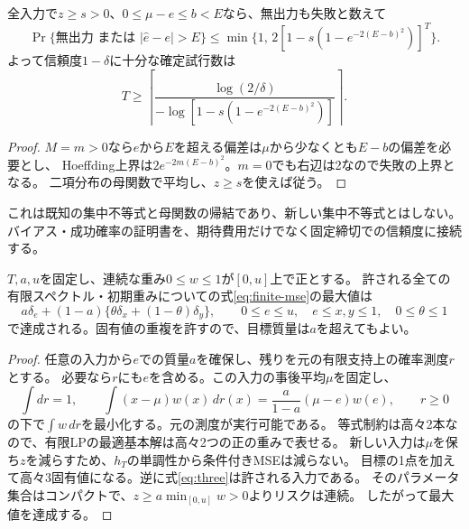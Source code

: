 \begin{corollary}[固定締切での一様信頼度]\label{cor:deadline}
全入力で$z\geq s>0$、$0\leq\mu-e\leq b<E$なら、無出力も失敗と数えて
\begin{equation}\label{eq:deadline-confidence}
 \Pr\{\text{無出力 または }|\widehat e-e|>E\}
 \leq\min\{1,\,2[1-s(1-e^{-2(E-b)^2})]^T\}.
\end{equation}
よって信頼度$1-\delta$に十分な確定試行数は
\[
 T\geq\left\lceil\frac{\log(2/\delta)}
 {-\log[1-s(1-e^{-2(E-b)^2})]}\right\rceil.
\]
\end{corollary}
\begin{proof}
$M=m>0$なら$e$から$E$を超える偏差は$\mu$から少なくとも$E-b$の偏差を必要とし、
Hoeffding上界は$2e^{-2m(E-b)^2}$。$m=0$でも右辺は2なので失敗の上界となる。
二項分布の母関数で平均し、$z\geq s$を使えば従う。
\end{proof}
これは既知の集中不等式と母関数の帰結であり、新しい集中不等式とはしない。
バイアス・成功確率の証明書を、期待費用だけでなく固定締切での信頼度に接続する。

\begin{theorem}\label{thm:three}
$T,a,u$を固定し、連続な重み$0\leq w\leq1$が$[0,u]$上で正とする。
許される全ての有限スペクトル・初期重みについての式\eqref{eq:finite-mse}の最大値は
\begin{equation}\label{eq:three}
 a\delta_e+(1-a)\{\theta\delta_x+(1-\theta)\delta_y\},\qquad
 0\leq e\leq u,\quad e\leq x,y\leq1,\quad0\leq\theta\leq1
\end{equation}
で達成される。固有値の重複を許すので、目標質量は$a$を超えてもよい。
\end{theorem}
\begin{proof}
任意の入力から$e$での質量$a$を確保し、残りを元の有限支持上の確率測度$r$とする。
必要なら$r$にも$e$を含める。この入力の事後平均$\mu$を固定し、
\begin{equation}\label{eq:moment-lp}
 \int dr=1,\qquad
 \int(x-\mu)w(x)\,dr(x)=\frac{a}{1-a}(\mu-e)w(e),\qquad r\geq0
\end{equation}
の下で$\int w\,dr$を最小化する。元の測度が実行可能である。
等式制約は高々2本なので、有限LPの最適基本解は高々2つの正の重みで表せる。
新しい入力は$\mu$を保ち$z$を減らすため、$h_T$の単調性から条件付きMSEは減らない。
目標の1点を加えて高々3固有値になる。逆に式\eqref{eq:three}は許される入力である。
そのパラメータ集合はコンパクトで、$z\geq a\min_{[0,u]}w>0$よりリスクは連続。
したがって最大値を達成する。
\end{proof}

